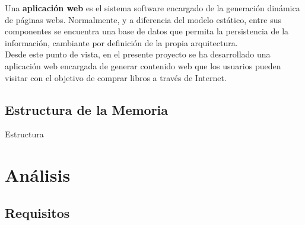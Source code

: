 \documentclass[a4paper]{report}
\begin{document}
    Una \textbf{aplicación web} es el sistema software encargado de la generación dinámica de páginas webs. Normalmente, y a diferencia del modelo estático, entre sus componentes se encuentra una base de datos que permita la persistencia de la información, cambiante por definición de la propia arquitectura.
    \\
    
    Desde este punto de vista, en el presente proyecto se ha desarrollado una aplicación web encargada de generar contenido web que los usuarios pueden visitar con el objetivo de comprar libros a través de Internet.

    \subsection{Estructura de la Memoria}
    Estructura

    \section{Análisis}

        \subsection{Requisitos}
\end{document}
